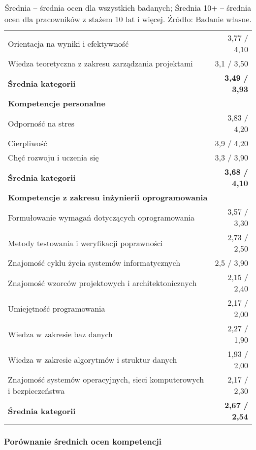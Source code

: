 \begin{table}[htbp]
\begin{tabular}{p{8cm} r}
Orientacja na wyniki i efektywność & 3{,}77 / 4{,}10 \\
Wiedza teoretyczna z zakresu zarządzania projektami & 3{,}1 / 3{,}50 \\
\textbf{Średnia kategorii} & \textbf{3{,}49 / 3{,}93} \\
\midrule
\multicolumn{2}{l}{\textbf{Kompetencje personalne}} \\
Odporność na stres & 3{,}83 / 4{,}20 \\
Cierpliwość & 3{,}9 / 4{,}20 \\
Chęć rozwoju i uczenia się & 3{,}3 / 3{,}90 \\
\textbf{Średnia kategorii} & \textbf{3{,}68 / 4{,}10} \\
\midrule
\multicolumn{2}{l}{\textbf{Kompetencje z zakresu inżynierii oprogramowania}} \\
Formułowanie wymagań dotyczących oprogramowania & 3{,}57 / 3{,}30 \\
Metody testowania i weryfikacji poprawności & 2{,}73 / 2{,}50 \\
Znajomość cyklu życia systemów informatycznych & 2{,}5 / 3{,}90 \\
Znajomość wzorców projektowych i architektonicznych & 2{,}15 / 2{,}40 \\
Umiejętność programowania & 2{,}17 / 2{,}00 \\
Wiedza w zakresie baz danych & 2{,}27 / 1{,}90 \\
Wiedza w zakresie algorytmów i struktur danych & 1{,}93 / 2{,}00 \\
Znajomość systemów operacyjnych, sieci komputerowych i bezpieczeństwa & 2{,}17 / 2{,}30 \\
\textbf{Średnia kategorii} & \textbf{2{,}67 / 2{,}54} \\
\bottomrule
\end{tabular}
\caption*{Średnia – średnia ocen dla wszystkich badanych; Średnia 10+ – średnia ocen dla pracowników z stażem 10 lat i więcej. Źródło: Badanie własne.}
\end{table}

\subsubsection{Porównanie średnich ocen kompetencji}

